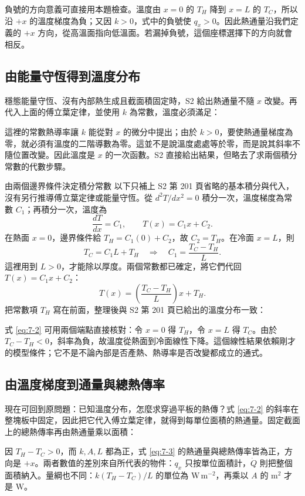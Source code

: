 負號的方向意義可直接用本題檢查。溫度由 \(x=0\) 的 \(T_H\) 降到 \(x=L\) 的 \(T_C\)，所以沿 \(+x\) 的溫度梯度為負；又因 \(k>0\)，式中的負號使 \(q_x>0\)。因此熱通量沿我們定義的 \(+x\) 方向，從高溫面指向低溫面。若漏掉負號，這個座標選擇下的方向就會相反。

\subsection{由能量守恆得到溫度分布}
穩態能量守恆、沒有內部熱生成且截面積固定時，S2 給出熱通量不隨 \(x\) 改變。再代入上面的傅立葉定律，並使用 \(k\) 為常數，溫度必須滿足：



這裡的常數熱導率讓 \(k\) 能從對 \(x\) 的微分中提出；由於 \(k>0\)，要使熱通量梯度為零，就必須有溫度的二階導數為零。這並不是說溫度處處等於零，而是說其斜率不隨位置改變。因此溫度是 \(x\) 的一次函數。S2 直接給出結果，但略去了求兩個積分常數的代數步驟。

\begin{aisupplement}{由兩個邊界條件決定積分常數}
以下只補上 S2 第 201 頁省略的基本積分與代入，沒有另行推導傅立葉定律或能量守恆。從 \(d^2T/dx^2=0\) 積分一次，溫度梯度為常數 \(C_1\)；再積分一次，溫度為
\[
\frac{dT}{dx}=C_1,\qquad T(x)=C_1x+C_2.
\]
在熱面 \(x=0\)，邊界條件給 \(T_H=C_1(0)+C_2\)，故 \(C_2=T_H\)。在冷面 \(x=L\)，則
\[
T_C=C_1L+T_H
\quad\Longrightarrow\quad
C_1=\frac{T_C-T_H}{L}.
\]
這裡用到 \(L>0\)，才能除以厚度。兩個常數都已確定，將它們代回 \(T(x)=C_1x+C_2\)：
\[
T(x)=\left(\frac{T_C-T_H}{L}\right)x+T_H.
\]
把常數項 \(T_H\) 寫在前面，整理後與 S2 第 201 頁已給出的溫度分布一致：

\end{aisupplement}

式 \eqref{eq:7-2} 可用兩個端點直接核對：令 \(x=0\) 得 \(T_H\)，令 \(x=L\) 得 \(T_C\)。由於 \(T_C-T_H<0\)，斜率為負，故溫度從熱面到冷面線性下降。這個線性結果依賴剛才的模型條件；它不是不論內部是否產熱、熱導率是否改變都成立的通式。

\subsection{由溫度梯度到通量與總熱傳率}
現在可回到原問題：已知溫度分布，怎麼求穿過平板的熱傳？式 \eqref{eq:7-2} 的斜率在整塊板中固定，因此把它代入傅立葉定律，就得到每單位面積的熱通量。固定截面上的總熱傳率再由熱通量乘以面積：



因 \(T_H-T_C>0\)，而 \(k,A,L\) 都為正，式 \eqref{eq:7-3} 的熱通量與總熱傳率皆為正，方向是 \(+x\)。兩者數值的差別來自所代表的物件：\(q_x\) 只按單位面積計，\(\dot Q\) 則把整個面積納入。量綱也不同：\(k(T_H-T_C)/L\) 的單位為 \(\mathrm{W\,m^{-2}}\)，再乘以 \(A\) 的 \(\mathrm{m^2}\) 才是 \(\mathrm W\)。

